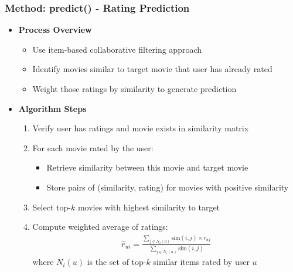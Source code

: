 \documentclass{beamer}
\begin{document}
\begin{frame}
\frametitle{Method: predict() - Rating Prediction}

\begin{itemize}
    \item \textbf{Process Overview}
    \begin{itemize}
        \item Use item-based collaborative filtering approach
        \item Identify movies similar to target movie that user has already rated
        \item Weight those ratings by similarity to generate prediction
    \end{itemize}

    \vspace{0.5cm}
    
    \item \textbf{Algorithm Steps}
    \begin{enumerate}
        \item Verify user has ratings and movie exists in similarity matrix
        \item For each movie rated by the user:
        \begin{itemize}
            \item Retrieve similarity between this movie and target movie
            \item Store pairs of (similarity, rating) for movies with positive similarity
        \end{itemize}
        \item Select top-$k$ movies with highest similarity to target
        \item Compute weighted average of ratings:
        \begin{align*}
        \hat{r}_{ui} = \frac{\sum_{j \in N_i(u)} \text{sim}(i,j) \times r_{uj}}{\sum_{j \in N_i(u)} \text{sim}(i,j)}
        \end{align*}
        where $N_i(u)$ is the set of top-$k$ similar items rated by user $u$
    \end{enumerate}
\end{itemize}
\end{frame}
\end{document}
